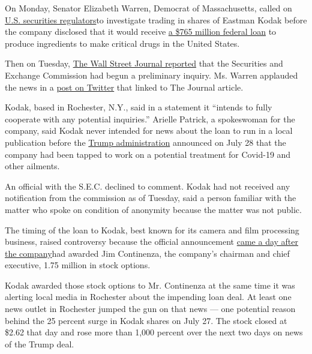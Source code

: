 On Monday, Senator Elizabeth Warren, Democrat of Massachusetts, called
on
\href{https://www.warren.senate.gov/imo/media/doc/2020.08.03\%20Letter\%20to\%20SEC\%20re\%20Kodak\%20stock\%20trades.pdf}{U.S.
securities regulators}to investigate trading in shares of Eastman Kodak
before the company disclosed that it would receive
\href{https://www.nytimes.com/live/2020/07/28/business/stock-market-today-coronavirus/the-united-states-will-lend-kodak-765-million-to-make-drug-components}{a
\$765 million federal loan} to produce ingredients to make critical
drugs in the United States.

Then on Tuesday,
\href{https://www.wsj.com/articles/kodak-loan-disclosure-and-stock-surge-under-sec-investigation-11596559126}{The
Wall Street Journal reported} that the Securities and Exchange
Commission had begun a preliminary inquiry. Ms. Warren applauded the
news in a
\href{https://twitter.com/SenWarren/status/1290697801882632193}{post on
Twitter} that linked to The Journal article.

Kodak, based in Rochester, N.Y., said in a statement it ``intends to
fully cooperate with any potential inquiries.'' Arielle Patrick, a
spokeswoman for the company, said Kodak never intended for news about
the loan to run in a local publication before the
\href{https://www.nytimes.com/live/2020/07/28/business/stock-market-today-coronavirus\#the-united-states-will-lend-kodak-765-million-to-make-drug-components}{Trump
administration} announced on July 28 that the company had been tapped to
work on a potential treatment for Covid-19 and other ailments.

An official with the S.E.C. declined to comment. Kodak had not received
any notification from the commission as of Tuesday, said a person
familiar with the matter who spoke on condition of anonymity because the
matter was not public.

The timing of the loan to Kodak, best known for its camera and film
processing business, raised controversy because the official
announcement
\href{https://www.nytimes.com/2020/07/31/business/kodak-ceo-stock-options.html}{came
a day after the company}had awarded Jim Continenza, the company's
chairman and chief executive, 1.75 million in stock options.

Kodak awarded those stock options to Mr. Continenza at the same time it
was alerting local media in Rochester about the impending loan deal. At
least one news outlet in Rochester jumped the gun on that news --- one
potential reason behind the 25 percent surge in Kodak shares on July 27.
The stock closed at \$2.62 that day and rose more than 1,000 percent
over the next two days on news of the Trump deal.

